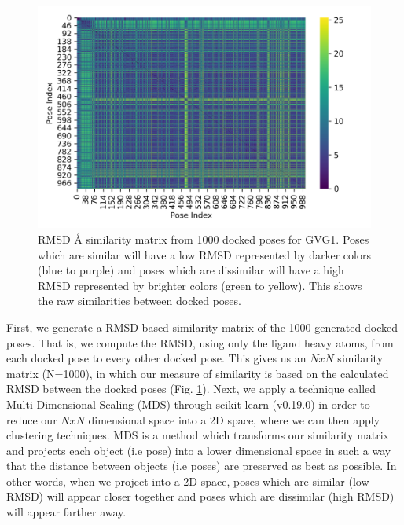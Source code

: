\begin{figure}
    \centering
    \includegraphics[width=\linewidth]{chapter6/Figures/GVG_1-rmsd_matrix.png}
    \caption[RMSD Similarity Matrix]{RMSD {\AA} similarity matrix from 1000 docked poses for GVG1. Poses which are similar will have a low RMSD represented by darker colors (blue to purple) and poses which are dissimilar will have a high RMSD represented by brighter colors (green to yellow). This shows the raw similarities between docked poses.}
    \label{fig:similarity_matrix}
\end{figure}

First, we generate a RMSD-based similarity matrix of the 1000 generated docked poses.
That is, we compute the RMSD, using only the ligand heavy atoms, from each docked pose to every other docked pose.
This gives us an $N x N$ similarity matrix (N=1000), in which our measure of similarity is based on the calculated RMSD between the docked poses (Fig. \ref{fig:similarity_matrix}).
Next, we apply a technique called Multi-Dimensional Scaling (MDS) through scikit-learn (v0.19.0) \cite{scikit_mds} in order to reduce our $N x N$ dimensional space into a 2D space, where we can then apply clustering techniques.
MDS is a method which transforms our similarity matrix and projects each object (i.e pose) into a lower dimensional space in such a way that the distance between objects (i.e poses) are preserved as best as possible.
In other words, when we project into a 2D space, poses which are similar (low RMSD) will appear closer together and poses which are dissimilar (high RMSD) will appear farther away.

